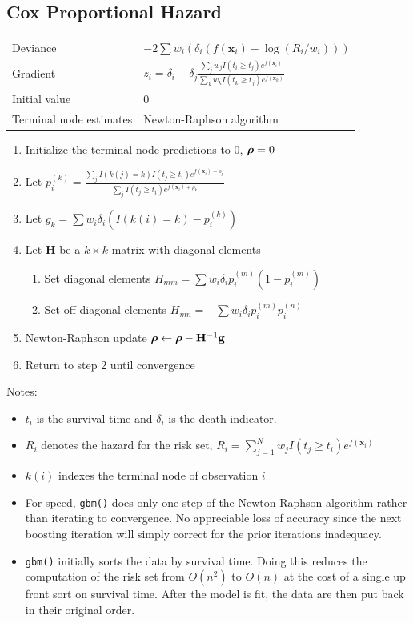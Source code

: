 \documentclass{article}
\newcommand{\mathgbf}[1]{{\mbox{\boldmath$#1$\unboldmath}}}
\begin{document}
\subsection{Cox Proportional Hazard}

\begin{tabular}{ll}
Deviance & $-2\sum w_i(\delta_i(f(\mathbf{x}_i)-\log(R_i/w_i)))$\\
Gradient & $\displaystyle z_i=\delta_i - \delta_j
            \frac{\sum_j w_jI(t_i\geq t_j)e^{f(\mathbf{x}_i)}}
                 {\sum_k w_kI(t_k\geq t_j)e^{f(\mathbf{x}_k)}}$ \\
Initial value & 0 \\
Terminal node estimates & Newton-Raphson algorithm
\end{tabular}

\begin{enumerate}
  \item Initialize the terminal node predictions to 0, $\mathgbf{\rho}=0$
  \item Let $\displaystyle
             p_i^{(k)}=\frac{\sum_j I(k(j)=k)I(t_j\geq t_i)e^{f(\mathbf{x}_i)+\rho_k}}
                            {\sum_j I(t_j\geq t_i)e^{f(\mathbf{x}_i)+\rho_k}}$
  \item Let $g_k=\sum w_i\delta_i\left(I(k(i)=k)-p_i^{(k)}\right)$
  \item Let $\mathbf{H}$ be a $k\times k$ matrix with diagonal elements
  \begin{enumerate}
     \item Set diagonal elements $H_{mm}=\sum w_i\delta_i p_i^{(m)}\left(1-p_i^{(m)}\right)$
     \item Set off diagonal elements $H_{mn}=-\sum w_i\delta_i p_i^{(m)}p_i^{(n)}$
  \end{enumerate}
  \item Newton-Raphson update $\mathgbf{\rho} \leftarrow \mathgbf{\rho} - \mathbf{H}^{-1}\mathbf{g}$
  \item Return to step 2 until convergence
\end{enumerate}

Notes:
\begin{itemize}
\item $t_i$ is the survival time and $\delta_i$ is the death indicator.
\item $R_i$ denotes the hazard for the risk set, $R_i=\sum_{j=1}^N w_jI(t_j\geq t_i)e^{f(\mathbf{x}_i)}$
\item $k(i)$ indexes the terminal node of observation $i$
\item For speed, \texttt{gbm()} does only one step of the Newton-Raphson algorithm rather than iterating to convergence. No appreciable loss of accuracy since the next boosting iteration will simply correct for the prior iterations inadequacy.
\item \texttt{gbm()} initially sorts the data by survival time. Doing this reduces the computation of the risk set from $O(n^2)$ to $O(n)$ at the cost of a single up front sort on survival time. After the model is fit, the data are then put back in their original order.
\end{itemize}
\end{document}
